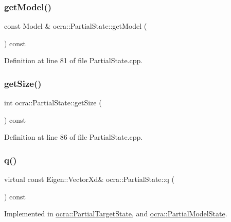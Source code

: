 \subsubsection{\texorpdfstring{get\+Model()}{getModel()}}
{\footnotesize\ttfamily const Model \& ocra\+::\+Partial\+State\+::get\+Model (\begin{DoxyParamCaption}{ }\end{DoxyParamCaption}) const}



Definition at line 81 of file Partial\+State.\+cpp.

\hypertarget{classocra_1_1PartialState_a220a155999e190427083af329d1f52b0}{}\label{classocra_1_1PartialState_a220a155999e190427083af329d1f52b0} 
\subsubsection{\texorpdfstring{get\+Size()}{getSize()}}
{\footnotesize\ttfamily int ocra\+::\+Partial\+State\+::get\+Size (\begin{DoxyParamCaption}{ }\end{DoxyParamCaption}) const}



Definition at line 86 of file Partial\+State.\+cpp.

\hypertarget{classocra_1_1PartialState_a28f537d2c569eddb7f7d6dbbea073226}{}\label{classocra_1_1PartialState_a28f537d2c569eddb7f7d6dbbea073226} 
\subsubsection{\texorpdfstring{q()}{q()}}
{\footnotesize\ttfamily virtual const Eigen\+::\+Vector\+Xd\& ocra\+::\+Partial\+State\+::q (\begin{DoxyParamCaption}{ }\end{DoxyParamCaption}) const\hspace{0.3cm}{\ttfamily [pure virtual]}}



Implemented in \hyperlink{classocra_1_1PartialTargetState_af953d48bac74ff93ed79d4c75bde207f}{ocra\+::\+Partial\+Target\+State}, and \hyperlink{classocra_1_1PartialModelState_ac50f637a2ce55608b4159b7dac2c543d}{ocra\+::\+Partial\+Model\+State}.

